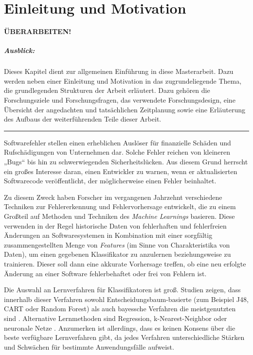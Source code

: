 
\chapter{Einleitung und Motivation}

\textbf{ÜBERARBEITEN!}

\paragraph{Ausblick:}
Dieses Kapitel dient zur allgemeinen Einführung in diese Masterarbeit. Dazu werden neben einer Einleitung und Motivation in das zugrundeliegende Thema, die grundlegenden Strukturen der Arbeit erläutert. Dazu gehören die Forschungsziele und Forschungsfragen, das verwendete Forschungsdesign, eine Übersicht der angedachten und tatsächlichen Zeitplanung sowie eine Erläuterung des Aufbaus der weiterführenden Teile dieser Arbeit.
\\
\hrule

Softwarefehler stellen einen erheblichen Auslöser für finanzielle Schäden und Rufschädigungen von Unternehmen dar. Solche Fehler reichen von kleineren „Bugs“ bis hin zu schwerwiegenden Sicherheitslücken. Aus diesem Grund herrscht ein großes Interesse daran, einen Entwickler zu warnen, wenn er aktualisierten Softwarecode veröffentlicht, der möglicherweise einen Fehler beinhaltet. 

Zu diesem Zweck haben Forscher im vergangenen Jahrzehnt verschiedene Techniken zur Fehlererkennung und Fehlervorhersage entwickelt, die zu einem Großteil auf Methoden und Techniken des \emph{Machine Learnings} basieren. Diese verwenden in der Regel historische Daten von fehlerhaften und fehlerfreien Änderungen an Softwaresystemen in Kombination mit einer sorgfältig zusammengestellten Menge von \emph{Features} (im Sinne von Charakteristika von Daten), um einen gegebenen Klassifikator zu anzulernen beziehungsweise zu trainieren. Dieser soll dann eine akkurate Vorhersage treffen, ob eine neu erfolgte Änderung an einer Software fehlerbehaftet oder frei von Fehlern ist. 

Die Auswahl an Lernverfahren für Klassifikatoren ist groß. Studien zeigen, dass innerhalb dieser Verfahren sowohl Entscheidungsbaum-basierte (zum Beispiel J48, CART oder Random Forest) als auch bayessche Verfahren die meistgenutzten sind \cite{Son2019}. Alternative Lernmethoden sind Regression, k-Nearest-Neighbor oder neuronale Netze \cite{Challagulla2008}. Anzumerken ist allerdings, dass es keinen Konsens über die beste verfügbare Lernverfahren gibt, da jedes Verfahren unterschiedliche Stärken und Schwächen für bestimmte Anwendungsfälle aufweist.

